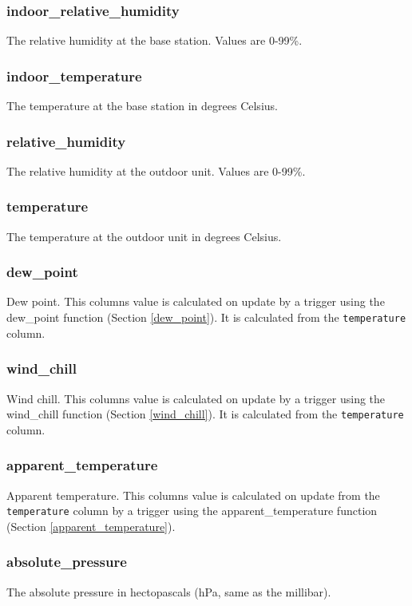 \documentclass[a4paper,10pt]{book}
\begin{document}
\subsubsection{indoor\_relative\_humidity}
The relative humidity at the base station. Values are 0-99\%. 

\subsubsection{indoor\_temperature}
The temperature at the base station in degrees Celsius. 

\subsubsection{relative\_humidity}
The relative humidity at the outdoor unit. Values are 0-99\%.

\subsubsection{temperature}
The temperature at the outdoor unit in degrees Celsius.

\subsubsection{dew\_point}
Dew point. This columns value is calculated on update by a trigger using the dew\_point function (Section \ref{dew_point}). It is calculated from the \verb|temperature| column.

\subsubsection{wind\_chill}
Wind chill. This columns value is calculated on update by a trigger using the wind\_chill function (Section \ref{wind_chill}). It is calculated from the \verb|temperature| column.

\subsubsection{apparent\_temperature}
Apparent temperature. This columns value is calculated on update from the \verb|temperature| column by a trigger using the apparent\_temperature function (Section \ref{apparent_temperature}).

\subsubsection{absolute\_pressure}
The absolute pressure in hectopascals (hPa, same as the millibar).
\end{document}
